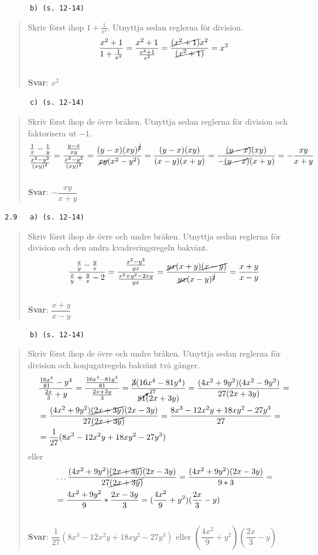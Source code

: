 \documentclass[a4paper]{article}
\newcommand{\tskcol}[1]{\textcolor{tskcol}{#1}}
\begin{document}
	\texttt{\tskcol{~~~~~~b) (s. 12-14)}}
	\begin{quotation}
		\noindent
		Skriv först ihop $1+\frac{1}{x^2}$. Utnyttja sedan reglerna för division.
		\[\dfrac{x^2+1}{1+\frac{1}{x^2}}=
		\dfrac{x^2+1}{\frac{x^2+1}{x^2}}=
		\dfrac{\cancel{(x^2+1)}x^2}{\cancel{(x^2+1)}}=
		x^2\]
		\\
		\textbf{Svar}: $x^2$
	\end{quotation}
	
	\texttt{\tskcol{~~~~~~c) (s. 12-14)}}
	\begin{quotation}
		\noindent
		Skriv först ihop de övre bråken. Utnyttja sedan reglerna för division och faktorisera ut $-1$.
		\[\dfrac{\frac{1}{x}-\frac{1}{y}}{\frac{x^2-y^2}{(xy)^2}}=
		\dfrac{\frac{y-x}{xy}}{\frac{x^2-y^2}{(xy)^2}}=
		\dfrac{(y-x)(xy)^{\cancel{2}}}{\cancel{xy}(x^2-y^2)}=
		\dfrac{(y-x)(xy)}{(x-y)(x+y)}=
		\dfrac{\cancel{(y-x)}(xy)}{-\cancel{(y-x)}(x+y)}=
		-\dfrac{xy}{x+y}\]
		\\
		\textbf{Svar}: $-\dfrac{xy}{x+y}$
	\end{quotation}
	
	\pagebreak
	\texttt{\tskcol{2.9~~~a) (s. 12-14)}}
	\begin{quotation}
		\noindent
		Skriv först ihop de övre och undre bråken. Utnyttja sedan reglerna för division och den andra kvadreringsregeln bakvänt.
		\[\dfrac{\frac{x}{y}- \frac{y}{x}}{\frac{x}{y}+\frac{y}{x}-2}=
		\dfrac{\frac{x^2-y^2}{yx}}{\frac{x^2+y^2-2xy}{yx}}=
		\dfrac{\cancel{yx}(x+y)\cancel{(x-y)}}{\cancel{yx}(x-y)^{\cancel{2}}}=
		\dfrac{x+y}{x-y}\]
		\\
		\textbf{Svar}: $\dfrac{x+y}{x-y}$
	\end{quotation}
	
	\texttt{\tskcol{~~~~~~b) (s. 12-14)}}
	\begin{quotation}
		\noindent
		Skriv först ihop de övre och undre bråken. Utnyttja sedan reglerna för division och konjugatregeln bakvänt två gånger.
		\begin{align*}
		&\dfrac{\frac{16x^4}{81}-y^4}{\frac{2x}{3}+y}=
		\dfrac{\frac{16x^4-81y^4}{81}}{\frac{2x+3y}{3}}=
		\dfrac{\cancel{3}(16x^4-81y^4)}{\cancelto{27}{81}(2x+3y)}= 
		\dfrac{(4x^2+9y^2)(4x^2-9y^2)}{27(2x+3y)}=\\
		&=\dfrac{(4x^2+9y^2)\cancel{(2x+3y)}(2x-3y)}{27\cancel{(2x+3y)}}=
		\dfrac{8x^3-12x^2y+18xy^2-27y^3}{27}= \\
		&=\dfrac{1}{27}(8x^3-12x^2y+18xy^2-27y^3)
		\end{align*}
		eller
		\begin{align*}
		&\ldots\dfrac{(4x^2+9y^2)\cancel{(2x+3y)}(2x-3y)}{27\cancel{(2x+3y)}}=
		\dfrac{(4x^2+9y^2)(2x-3y)}{9*3}= \\
		&=\dfrac{4x^2+9y^2}{9}*\dfrac{2x-3y}{3}=
		(\dfrac{4x^2}{9}+y^2)(\dfrac{2x}{3}-y)
		\end{align*}
		\\
		\textbf{Svar}: $\dfrac{1}{27}(8x^3-12x^2y+18xy^2-27y^3)$ eller $(\dfrac{4x^2}{9}+y^2)(\dfrac{2x}{3}-y)$
	\end{quotation}
	
\end{document}
